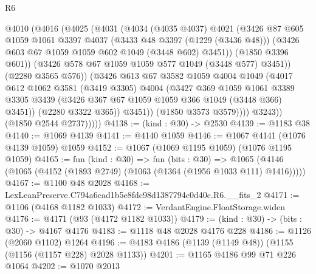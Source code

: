 \begin{lexlean}{R6}
\begin{coremodule}
                    @4010
                      (@4016
                        (@4025
                          (@4031
                            (@4034
                              (@4035 @4037)
                              @4021
                              (@3426
                                @87
                                @605
                                @1059
                                @1061
                                @3397
                                @4037
                                (@3433 @48 @3397 (@1229 (@3436 @48)))
                                (@3426 @603 @67 @1059 @1059 @602 @1049 (@3448 @602) @3451))
                              (@1850 @3396 @601))
                            (@3426 @578 @67 @1059 @1059 @577 @1049 (@3448 @577) @3451))
                          (@2280 @3565 @576))
                        (@3426
                          @613
                          @67
                          @3582
                          @1059
                          @4004
                          @1049
                          (@4017
                            @612
                            @1062
                            @3581
                            (@3419 @3305)
                            @4004
                            (@3427
                              @369
                              @1059
                              @1061
                              @3389
                              @3305
                              @3439
                              (@3426 @367 @67 @1059 @1059 @366 @1049 (@3448 @366) @3451))
                            (@2280 @3322 @365))
                          @3451))
                      (@1850 @3573 @3579))))
                @3243))
            (@1850 @2544 @2737)))))
@4138 := (kind : @30) -> @2530
@4139 := @1183 @38
@4140 := @1069 @4139
@4141 := @4140 @1059
@4146 := @1067 @4141 (@1076 @4139 @1059) @1059
@4152 := @1067 (@1069 @1195 @1059) (@1076 @1195 @1059)
@4165 := fun (kind : @30) =>
  fun (bits : @30) =>
  @1065 (@4146 (@1065 (@4152 (@1893 @2749) (@1063 (@1364 (@1956 @1033 @111) @1416)))))
@4167 := @1100 @48 @2028
@4168 := LexLeanPreserve.C794a6cad1b5e8fdc98d1387794c0d40c.R6.__fits_2
@4171 := @1106 (@4168 @1182 @1033)
@4172 := VerdantEngine.FloatStorage.widen
@4176 := @4171 (@93 (@4172 @1182 @1033))
@4179 := (kind : @30) -> (bits : @30) -> @4167 @4176
@4183 := @1118 @48 @2028 @4176 @228
@4186 := @1126 (@2060 @1102) @1264
@4196 := @4183 @4186 (@1139 (@1149 @48)) (@1155 (@1156 (@1157 @228) @2028 @1133))
@4201 := @1165 @4186 @99 @71 @226 @1064
@4202 := @1070 @2013

\end{coremodule}
\end{lexlean}
